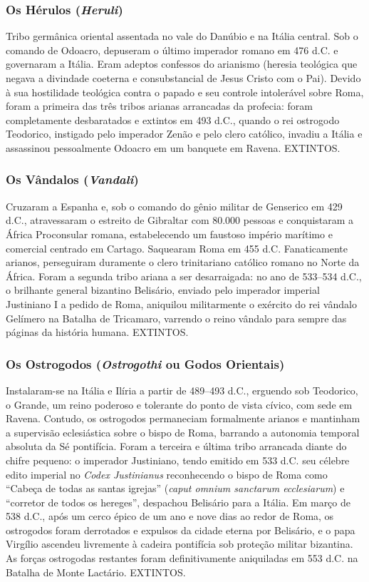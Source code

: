 \documentclass[11pt,a4paper,openany]{book}
\begin{document}
\subsubsection*{Os Hérulos (\textit{Heruli})}
Tribo germânica oriental assentada no vale do Danúbio e na Itália central. Sob o comando de Odoacro, depuseram o último imperador romano em 476 d.C. e governaram a Itália. Eram adeptos confessos do arianismo (heresia teológica que negava a divindade coeterna e consubstancial de Jesus Cristo com o Pai). Devido à sua hostilidade teológica contra o papado e seu controle intolerável sobre Roma, foram a primeira das três tribos arianas arrancadas da profecia: foram completamente desbaratados e extintos em 493 d.C., quando o rei ostrogodo Teodorico, instigado pelo imperador Zenão e pelo clero católico, invadiu a Itália e assassinou pessoalmente Odoacro em um banquete em Ravena. EXTINTOS.


\subsubsection*{Os Vândalos (\textit{Vandali})}
Cruzaram a Espanha e, sob o comando do gênio militar de Genserico em 429 d.C., atravessaram o estreito de Gibraltar com 80.000 pessoas e conquistaram a África Proconsular romana, estabelecendo um faustoso império marítimo e comercial centrado em Cartago. Saquearam Roma em 455 d.C. Fanaticamente arianos, perseguiram duramente o clero trinitariano católico romano no Norte da África. Foram a segunda tribo ariana a ser desarraigada: no ano de 533–534 d.C., o brilhante general bizantino Belisário, enviado pelo imperador imperial Justiniano I a pedido de Roma, aniquilou militarmente o exército do rei vândalo Gelímero na Batalha de Tricamaro, varrendo o reino vândalo para sempre das páginas da história humana. EXTINTOS.


\subsubsection*{Os Ostrogodos (\textit{Ostrogothi} ou Godos Orientais)}
Instalaram-se na Itália e Ilíria a partir de 489–493 d.C., erguendo sob Teodorico, o Grande, um reino poderoso e tolerante do ponto de vista cívico, com sede em Ravena. Contudo, os ostrogodos permaneciam formalmente arianos e mantinham a supervisão eclesiástica sobre o bispo de Roma, barrando a autonomia temporal absoluta da Sé pontifícia. Foram a terceira e última tribo arrancada diante do chifre pequeno: o imperador Justiniano, tendo emitido em 533 d.C. seu célebre edito imperial no \textit{Codex Justinianus} reconhecendo o bispo de Roma como ``Cabeça de todas as santas igrejas'' (\textit{caput omnium sanctarum ecclesiarum}) e ``corretor de todos os hereges'', despachou Belisário para a Itália. Em março de 538 d.C., após um cerco épico de um ano e nove dias ao redor de Roma, os ostrogodos foram derrotados e expulsos da cidade eterna por Belisário, e o papa Virgílio ascendeu livremente à cadeira pontifícia sob proteção militar bizantina. As forças ostrogodas restantes foram definitivamente aniquiladas em 553 d.C. na Batalha de Monte Lactário. EXTINTOS.
\end{document}
